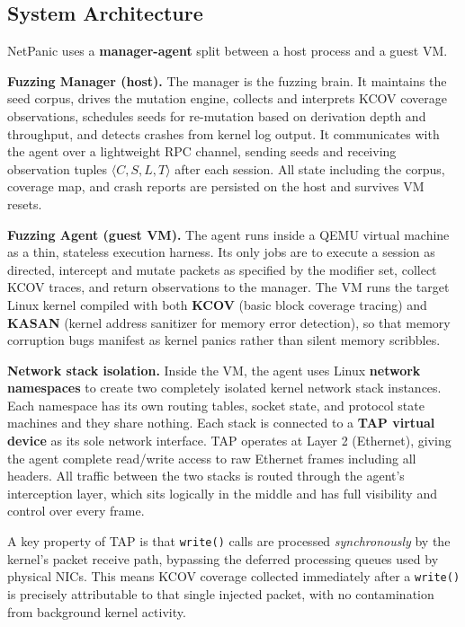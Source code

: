 \documentclass[10pt]{article}
\begin{document}
\subsection{System Architecture}

NetPanic uses a \textbf{manager-agent} split between a host process and a guest VM.

\textbf{Fuzzing Manager (host).} The manager is the fuzzing brain. It maintains the seed corpus, drives the mutation engine, collects and interprets KCOV coverage observations, schedules seeds for re-mutation based on derivation depth and throughput, and detects crashes from kernel log output. It communicates with the agent over a lightweight RPC channel, sending seeds and receiving observation tuples $\langle C, S, L, T\rangle$ after each session. All state including the corpus, coverage map, and crash reports are persisted on the host and survives VM resets.

\textbf{Fuzzing Agent (guest VM).} The agent runs inside a QEMU virtual machine as a thin, stateless execution harness. Its only jobs are to execute a session as directed, intercept and mutate packets as specified by the modifier set, collect KCOV traces, and return observations to the manager. The VM runs the target Linux kernel compiled with both \textbf{KCOV} (basic block coverage tracing) and \textbf{KASAN} (kernel address sanitizer for memory error detection), so that memory corruption bugs manifest as kernel panics rather than silent memory scribbles.

\textbf{Network stack isolation.} Inside the VM, the agent uses Linux \textbf{network namespaces} to create two completely isolated kernel network stack instances. Each namespace has its own routing tables, socket state, and protocol state machines and they share nothing. Each stack is connected to a \textbf{TAP virtual device} as its sole network interface. TAP operates at Layer 2 (Ethernet), giving the agent complete read/write access to raw Ethernet frames including all headers. All traffic between the two stacks is routed through the agent's interception layer, which sits logically in the middle and has full visibility and control over every frame.

A key property of TAP is that \texttt{write()} calls are processed \emph{synchronously} by the kernel's packet receive path, bypassing the deferred processing queues used by physical NICs. This means KCOV coverage collected immediately after a \texttt{write()} is precisely attributable to that single injected packet, with no contamination from background kernel activity.
\end{document}
